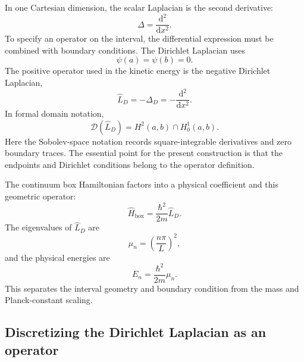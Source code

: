 In one Cartesian dimension, the scalar Laplacian is the second derivative:
\begin{equation}
  \Delta=\frac{\mathrm{d}^2}{\mathrm{d}x^2}.
\end{equation}
To specify an operator on the interval, the differential expression must be
combined with boundary conditions. The Dirichlet Laplacian uses
\begin{equation}
  \psi(a)=\psi(b)=0.
\end{equation}
The positive operator used in the kinetic energy is the negative Dirichlet
Laplacian,
\begin{equation}
  \hat L_D=-\Delta_D=-\frac{\mathrm{d}^2}{\mathrm{d}x^2}.
\end{equation}
In formal domain notation,
\begin{equation}
  \mathcal D(\hat L_D)
  =H^2(a,b)\cap H_0^1(a,b).
\end{equation}
Here the Sobolev-space notation records square-integrable derivatives and zero
boundary traces. The essential point for the present construction is that the
endpoints and Dirichlet conditions belong to the operator definition.

The continuum box Hamiltonian factors into a physical coefficient and this
geometric operator:
\begin{equation}
  \hat H_{\mathrm{box}}
  =\frac{\hbar^2}{2m}\hat L_D.
\end{equation}
The eigenvalues of \(\hat L_D\) are
\begin{equation}
  \mu_n=\left(\frac{n\pi}{L}\right)^2,
\end{equation}
and the physical energies are
\begin{equation}
  E_n=\frac{\hbar^2}{2m}\mu_n.
\end{equation}
This separates the interval geometry and boundary condition from the mass and
Planck-constant scaling.

\subsection{Discretizing the Dirichlet Laplacian as an operator}

